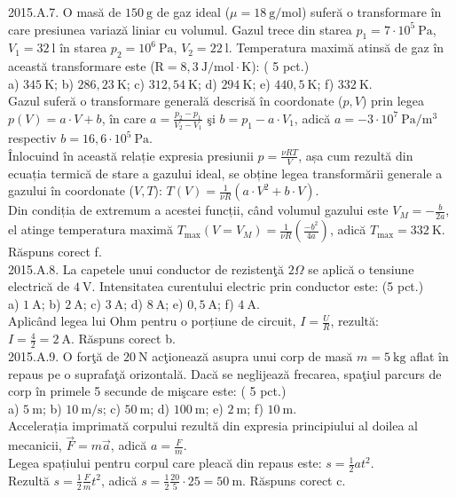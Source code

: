 2015.A.7. O masă de $150 \mathrm{~g}$ de gaz ideal ($\mu=18 \mathrm{~g} / \mathrm{mol}$) suferă o transformare în care presiunea variază liniar cu volumul. Gazul trece din starea $p_{1}=7 \cdot 10^{5} \mathrm{~Pa}$, $V_{1}=32 \mathrm{~l}$ în starea $p_{2}=10^{6} \mathrm{~Pa}$, $V_{2}=22 \mathrm{~l}$. Temperatura maximă atinsă de gaz în această transformare este ($\mathrm{R}=8,3 \mathrm{~J} / \mathrm{mol} \cdot \mathrm{K}$): ( 5 pct.)\\ a) $345 \mathrm{~K}$; b) $286,23 \mathrm{~K}$; c) $312,54 \mathrm{~K}$; d) $294 \mathrm{~K}$; e) $440,5 \mathrm{~K}$; f) $332 \mathrm{~K}$.\\ Gazul suferă o transformare generală descrisă în coordonate ($p, V$) prin legea $p(V)=a \cdot V+b$, în care $a=\frac{p_{2}-p_{1}}{V_{2}-V_{1}}$ şi $b=p_{1}-a \cdot V_{1}$, adică $a=-3 \cdot 10^{7} \mathrm{~Pa} / \mathrm{m}^{3}$ respectiv $b=16,6 \cdot 10^{5} \mathrm{~Pa}$.\\ Înlocuind în această relație expresia presiunii $p=\frac{\nu R T}{V}$, așa cum rezultă din ecuația termică de stare a gazului ideal, se obține legea transformării generale a gazului în coordonate ($V, T$): $T(V)=\frac{1}{\nu R}\left(a \cdot V^{2}+b \cdot V\right)$.\\ Din condiția de extremum a acestei funcții, când volumul gazului este $V_{M}=-\frac{b}{2 a}$, el atinge temperatura maximă $T_{\text {max}}\left(V=V_{M}\right)=\frac{1}{\nu R}\left(\frac{-b^{2}}{4 a}\right)$, adică $T_{\text {max}}=332 \mathrm{~K}$. Răspuns corect f.\\

2015.A.8. La capetele unui conductor de rezistenţă $2 \Omega$ se aplică o tensiune electrică de $4 \mathrm{~V}$. Intensitatea curentului electric prin conductor este: (5 pct.)\\ a) $1 \mathrm{~A}$; b) $2 \mathrm{~A}$; c) $3 \mathrm{~A}$; d) $8 \mathrm{~A}$; e) $0,5 \mathrm{~A}$; f) $4 \mathrm{~A}$.\\ Aplicând legea lui Ohm pentru o porțiune de circuit, $I=\frac{U}{R}$, rezultă:\\ $I=\frac{4}{2}=2 \mathrm{~A}$. Răspuns corect b.\\

2015.A.9. O forţă de $20 \mathrm{~N}$ acţionează asupra unui corp de masă $m=5 \mathrm{~kg}$ aflat în repaus pe o suprafaţă orizontală. Dacă se neglijează frecarea, spaţiul parcurs de corp în primele 5 secunde de mişcare este: ( 5 pct.)\\ a) $5 \mathrm{~m}$; b) $10 \mathrm{~m} / \mathrm{s}$; c) $50 \mathrm{~m}$; d) $100 \mathrm{~m}$; e) $2 \mathrm{~m}$; f) $10 \mathrm{~m}$.\\ Accelerația imprimată corpului rezultă din expresia principiului al doilea al mecanicii, $\vec{F}=m \vec{a}$, adică $a=\frac{F}{m}$.\\ Legea spațiului pentru corpul care pleacă din repaus este: $s=\frac{1}{2} a t^{2}$.\\ Rezultă $s=\frac{1}{2} \frac{F}{m} t^{2}$, adică $s=\frac{1}{2} \frac{20}{5} \cdot 25=50 \mathrm{~m}$. Răspuns corect c.\\

